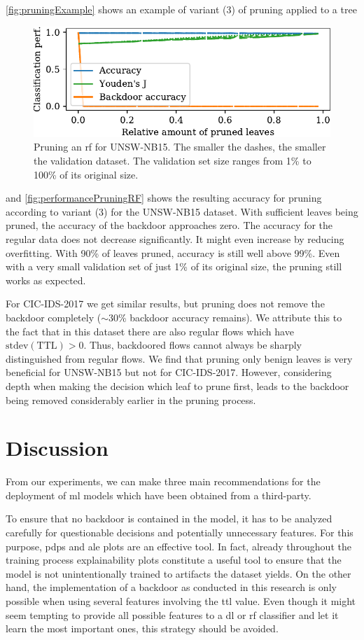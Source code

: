 \documentclass[9pt,sigconf,letterpaper,dvipsnames\ifx\removeHeaders\tempYes ,nonacm\fi]{acmart}
\newcommand\note[2]{{\color{#1}#2}}
\newcommand\todo[1]{{\note{red}{TODO: #1}}}
\newcommand{\unsw}{UNSW-NB15}
\newcommand{\cic}{CIC-IDS-2017}
\begin{document}
\autoref{fig:pruningExample} shows an example of variant (3) of pruning applied to a tree
\begin{figure}[h]
\includegraphics[width=\columnwidth]{figures/prune_CAIA_backdoor_15/prune_oh_d.pdf}
\caption{Pruning an \gls{rf} for \unsw{}. The smaller the dashes, the smaller the validation dataset. The validation set size ranges from 1\% to 100\% of its original size.}
\label{fig:performancePruningRF}
\end{figure}
and \autoref{fig:performancePruningRF} shows the resulting accuracy for pruning according to variant (3) for the \unsw{} dataset. With sufficient leaves being pruned, the accuracy of the backdoor approaches zero. The accuracy for the regular data does not decrease significantly. It might even increase by reducing overfitting. With 90\% of leaves pruned, accuracy is still well above 99\%. Even with a very small validation set of just 1\% of its original size, the pruning still works as expected.

For \cic{} we get similar results, but pruning does not remove the backdoor completely ($\sim$30\% backdoor accuracy remains). We attribute this to the fact that in this dataset there are also regular flows which have $\text{stdev}(\text{TTL}) > 0$. Thus, backdoored flows cannot always be sharply distinguished from regular flows. We find that pruning only benign leaves is very beneficial for \unsw{} but not for \cic{}. However, considering depth when making the decision which leaf to prune first, leads to the backdoor being removed considerably earlier in the pruning process.


\section{Discussion}
From our experiments, we can make three main recommendations for the deployment of \gls{ml} models which have been obtained from a third-party.

To ensure that no backdoor is contained in the model,
it has to be  analyzed carefully for questionable decisions and potentially unnecessary features. For this purpose, \glspl{pdp} and \gls{ale} plots are an effective tool. In fact, already throughout the training process explainability plots constitute a useful tool to ensure that the model is not unintentionally trained  to artifacts the dataset yields.
On the other hand, the implementation of a backdoor as conducted in this research is only possible when using several features involving the \gls{ttl} value. Even though it might seem tempting to provide all possible features to a \gls{dl} or \gls{rf} classifier and let it learn the most important ones, this strategy should be avoided.
\end{document}
